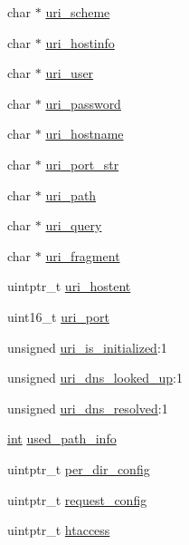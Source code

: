 \begin{DoxyCompactItemize}
\item 
char $\ast$ \hyperlink{structrequest__rec_ae38983f8193ffdcc7a4f61025882cffe}{uri\+\_\+scheme}
\item 
char $\ast$ \hyperlink{structrequest__rec_af4fd8ecbcdc98bea35b1b75a99a8970a}{uri\+\_\+hostinfo}
\item 
char $\ast$ \hyperlink{structrequest__rec_abaf14e944dd88ed29640c434d5e5deba}{uri\+\_\+user}
\item 
char $\ast$ \hyperlink{structrequest__rec_af43f044807480881658f5806a94a8ad2}{uri\+\_\+password}
\item 
char $\ast$ \hyperlink{structrequest__rec_a60f077fe8bf0d9d175e7abbd208bc84b}{uri\+\_\+hostname}
\item 
char $\ast$ \hyperlink{structrequest__rec_a10c40b62acb57eec9b47b463194325fc}{uri\+\_\+port\+\_\+str}
\item 
char $\ast$ \hyperlink{structrequest__rec_a9ef7453e3201792c99861462acf74a9f}{uri\+\_\+path}
\item 
char $\ast$ \hyperlink{structrequest__rec_a4f2192c05c3ce2240d4a30af9a832a7c}{uri\+\_\+query}
\item 
char $\ast$ \hyperlink{structrequest__rec_aadc46209b509d1b54a8e3a31b35dccfa}{uri\+\_\+fragment}
\item 
uintptr\+\_\+t \hyperlink{structrequest__rec_a709302d219dbe6c1bddba9f59c00f22e}{uri\+\_\+hostent}
\item 
uint16\+\_\+t \hyperlink{structrequest__rec_a985f2a182d07f8de5e83c2e21847cff7}{uri\+\_\+port}
\item 
unsigned \hyperlink{structrequest__rec_a8d171ddd5b901f74a2d029eafb98202b}{uri\+\_\+is\+\_\+initialized}\+:1
\item 
unsigned \hyperlink{structrequest__rec_a75bcfa1cdcae084984d9168a8de2f5cf}{uri\+\_\+dns\+\_\+looked\+\_\+up}\+:1
\item 
unsigned \hyperlink{structrequest__rec_aac574ce1af15c729c23fdb80a826b946}{uri\+\_\+dns\+\_\+resolved}\+:1
\item 
\hyperlink{pcre_8txt_a42dfa4ff673c82d8efe7144098fbc198}{int} \hyperlink{structrequest__rec_a5b463549b4dc27af708d9c577d1fc4c0}{used\+\_\+path\+\_\+info}
\item 
uintptr\+\_\+t \hyperlink{structrequest__rec_a0935ac19a61c462c8986898b4c30547d}{per\+\_\+dir\+\_\+config}
\item 
uintptr\+\_\+t \hyperlink{structrequest__rec_a64ddc7e883db1473c43254766c0c0c07}{request\+\_\+config}
\item 
uintptr\+\_\+t \hyperlink{structrequest__rec_a9d2dc4bbe8bb71486e68f8a706297eb1}{htaccess}

\end{DoxyCompactItemize}

